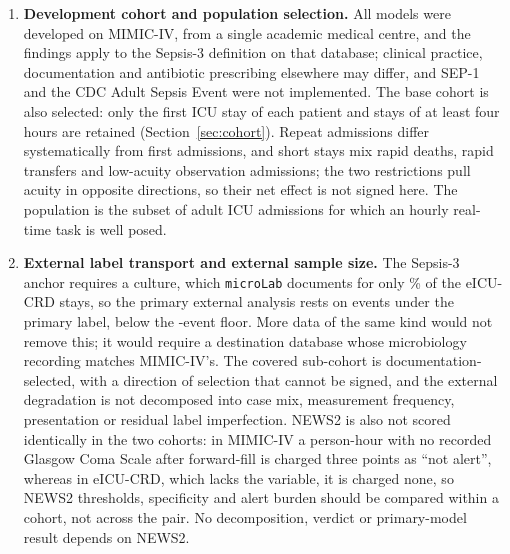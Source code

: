 \begin{enumerate}
    \item \textbf{Development cohort and population
    selection.}\label{lim:cohort_selection} All models were developed on
    MIMIC-IV, from a single academic medical centre, and the findings apply to
    the Sepsis-3 definition on that database; clinical practice, documentation
    and antibiotic prescribing elsewhere may differ, and SEP-1 and the CDC
    Adult Sepsis Event were not implemented. The base cohort is also selected:
    only the first ICU stay of each patient and stays of at least four hours
    are retained (Section~\ref{sec:cohort}). Repeat admissions differ
    systematically from first admissions, and short stays mix rapid deaths,
    rapid transfers and low-acuity observation admissions; the two
    restrictions pull acuity in opposite directions, so their net effect is not
    signed here. The population is the subset of adult ICU admissions for
    which an hourly real-time task is well posed.

    \item \textbf{External label transport and external sample
    size.}\label{lim:label_transport} The Sepsis-3 anchor requires a culture,
    which \texttt{microLab} documents for only \pcExtMicroCoverage\% of the
    \pcExtNCohortStays{} eICU-CRD stays, so the primary external analysis rests
    on \pcExtNEventsB{} events under the primary label, below the
    \pcExtMinEvents{}-event floor. More data of the same kind would not remove
    this; it would require a destination database whose microbiology recording
    matches MIMIC-IV's. The covered sub-cohort is documentation-selected, with
    a direction of selection that cannot be signed, and the external
    degradation is not decomposed into case mix, measurement frequency,
    presentation or residual label imperfection. NEWS2 is also not scored
    identically in the two cohorts: in MIMIC-IV a person-hour with no recorded
    Glasgow Coma Scale after forward-fill is charged three points as ``not
    alert'', whereas in eICU-CRD, which lacks the variable, it is charged none,
    so NEWS2 thresholds, specificity and alert burden should be compared within
    a cohort, not across the pair. No decomposition, verdict or primary-model
    result depends on NEWS2.


\end{enumerate}

